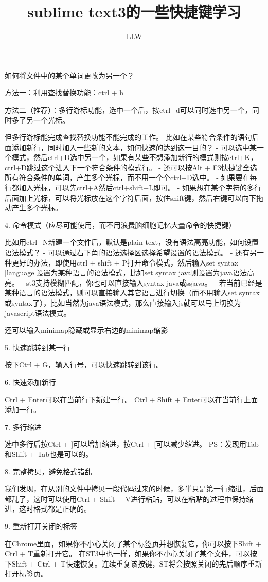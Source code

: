 \documentclass[a4paper,UTF8]{article}
\title{sublime text3的一些快捷键学习}
\author{LLW}
\date{}
\begin{document}
如何将文件中的某个单词更改为另一个？

方法一：利用查找替换功能：ctrl + h

方法二（推荐）：多行游标功能，选中一个后，按ctrl+d可以同时选中另一个，同时多了另一个光标。

但多行游标能完成查找替换功能不能完成的工作。
比如在某些符合条件的语句后面添加新行，同时加入一些新的文本，如何快速的达到这一目的？
- 可以选中某一个模式，然后ctrl+D选中另一个，如果有某些不想添加新行的模式则按ctrl+K，ctrl+D跳过这个进入下一个符合条件的模式行。
- 还可以按Alt + F3快捷键全选所有符合条件的单词，产生多个光标，而不用一个个ctrl+D选中。
- 如果要在每行都加入光标，可以先ctrl+A然后ctrl+shift+L即可。
- 如果想在某个字符的多行后面加上光标，可以将光标放在这个字符后面，按住shift键，然后右键可以向下拖动产生多个光标。

4. 命令模式（应尽可能使用，而不用浪费脑细胞记忆大量命令的快捷键）

比如用ctrl+N新建一个文件后，默认是plain text，没有语法高亮功能，如何设置语法模式？
- 可以通过右下角的语法选择区选择希望设置的语法模式。
- 还有另一种更好的办法，即使用ctrl + shift + P打开命令模式，然后输入set syntax [language]设置为某种语言的语法模式，比如set syntax java则设置为java语法高亮。
- st3支持模糊匹配，你也可以直接输入syntax java或ssjava。
- 若当前已经是某种语言的语法模式，则可以直接输入其它语言进行切换（而不用输入set syntax或syntax了），比如当然为java语法模式，那么直接输入js就可以马上切换为javascript语法模式。

还可以输入minimap隐藏或显示右边的minimap缩影

5. 快速跳转到某一行

按下Ctrl + G，输入行号，可以快速跳转到该行。

6. 快速添加新行

    Ctrl + Enter可以在当前行下新建一行。
    Ctrl + Shift + Enter可以在当前行上面添加一行。

7. 多行缩进

选中多行后按Ctrl + ]可以增加缩进，按Ctrl + [可以减少缩进。
PS：发现用Tab和Shift + Tab也是可以的。

8. 完整拷贝，避免格式错乱

我们发现，在从别的文件中拷贝一段代码过来的时候，多半只是第一行缩进，后面都乱了，这时可以使用Ctrl + Shift + V进行粘贴，可以在粘贴的过程中保持缩进，这时格式都是正确的。

9. 重新打开关闭的标签

在Chrome里面，如果你不小心关闭了某个标签页并想恢复它，你可以按下Shift + Ctrl + T重新打开它。
在ST3中也一样，如果你不小心关闭了某个文件，可以按下Shift + Ctrl + T快速恢复。连续重复该按键，ST将会按照关闭的先后顺序重新打开标签页。
\end{document}
